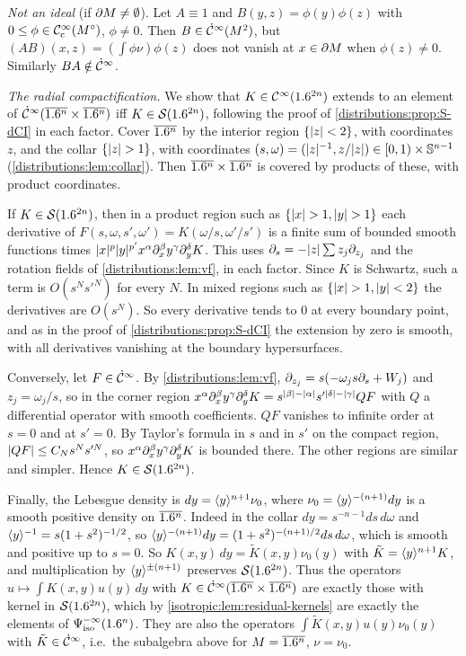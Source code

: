 \emph{Not an ideal} (if $\partial M\ne\emptyset$). Let $A\equiv1$ and $B(y,z)=\phi(y)\phi(z)$ with
$0\le\phi\in\mathcal{C}^\infty_{\mathrm{c}}(M^\circ)$, $\phi\ne0$. Then $B\in\dot{\mathcal{C}}^\infty(M^2)$, but $(AB)(x,z)=(\int\phi\nu)\phi(z)$ does not
vanish at $x\in\partial M$ when $\phi(z)\ne0$. Similarly $BA\notin\dot{\mathcal{C}}^\infty$.

\emph{The radial compactification.} We show that $K\in\mathcal{C}^\infty(1.6^{2n})$ extends to an element of
$\dot{\mathcal{C}}^\infty(\overline{1.6^n}\times\overline{1.6^n})$ iff $K\in\mathcal{S}(1.6^{2n})$, following the proof of
\cref{distributions:prop:S-dCI} in each factor. Cover $\overline{1.6^n}$ by the interior region
$\{\lvert z\rvert<2\}$, with coordinates $z$, and the collar $\{\lvert z\rvert>1\}$, with coordinates
$(s,\omega)=(\lvert z\rvert^{-1},z/\lvert z\rvert)\in[0,1)\times\mathbb{S}^{n-1}$ (\cref{distributions:lem:collar}). Then
$\overline{1.6^n}\times\overline{1.6^n}$ is covered by products of these, with product coordinates.

If $K\in\mathcal{S}(1.6^{2n})$, then in a product region such as $\{\lvert x\rvert>1,\lvert y\rvert>1\}$ each derivative of
$F(s,\omega,s',\omega')=K(\omega/s,\omega'/s')$ is a finite sum of bounded smooth functions times
$\lvert x\rvert^p\lvert y\rvert^{p'}x^\alpha\partial^\beta_xy^\gamma\partial^\delta_yK$. This uses $\partial_s=-\lvert z\rvert\sum z_j\partial_{z_j}$ and the
rotation fields of \cref{distributions:lem:vf}, in each factor. Since $K$ is Schwartz, such a
term is $O(s^Ns'^N)$ for every $N$. In mixed regions such as $\{\lvert x\rvert>1,\lvert y\rvert<2\}$ the derivatives
are $O(s^N)$. So every derivative tends to $0$ at every boundary point, and as in the proof
of \cref{distributions:prop:S-dCI} the extension by zero is smooth, with all derivatives
vanishing at the boundary hypersurfaces.

Conversely, let $F\in\dot{\mathcal{C}}^\infty$. By \cref{distributions:lem:vf},
$\partial_{z_j}=s(-\omega_js\partial_s+W_j)$ and $z_j=\omega_j/s$, so in the corner region
$x^\alpha\partial^\beta_xy^\gamma\partial^\delta_yK=s^{\lvert \beta\rvert-\lvert \alpha\rvert}s'^{\lvert \delta\rvert-\lvert \gamma\rvert}QF$ with $Q$ a differential
operator with smooth coefficients. $QF$ vanishes to infinite order at $s=0$ and at
$s'=0$. By Taylor's formula in $s$ and in $s'$ on the compact region, $\lvert QF\rvert\le C_Ns^Ns'^N$,
so $x^\alpha\partial^\beta_xy^\gamma\partial^\delta_yK$ is bounded there. The other regions are similar and
simpler. Hence $K\in\mathcal{S}(1.6^{2n})$.

Finally, the Lebesgue density is $dy=\langle y\rangle^{n+1}\nu_0$, where $\nu_0=\langle y\rangle^{-(n+1)}dy$ is a
smooth positive density on $\overline{1.6^n}$. Indeed in the collar $dy=s^{-n-1}ds\,d\omega$ and
$\langle y\rangle^{-1}=s(1+s^2)^{-1/2}$, so $\langle y\rangle^{-(n+1)}dy=(1+s^2)^{-(n+1)/2}ds\,d\omega$, which is smooth and
positive up to $s=0$. So
$K(x,y)\,dy=\tilde K(x,y)\nu_0(y)$ with $\tilde K=\langle y\rangle^{n+1}K$, and multiplication by $\langle y\rangle^{\pm(n+1)}$
preserves $\mathcal{S}(1.6^{2n})$. Thus the operators $u\mapsto\int K(x,y)u(y)\,dy$ with
$K\in\dot{\mathcal{C}}^\infty(\overline{1.6^n}\times\overline{1.6^n})$ are exactly those with kernel in $\mathcal{S}(1.6^{2n})$, which by
\cref{isotropic:lem:residual-kernels} are exactly the elements of $\Psi^{-\infty}_{\mathrm{iso}}(1.6^n)$. They are
also the operators $\int\tilde K(x,y)u(y)\nu_0(y)$ with $\tilde K\in\dot{\mathcal{C}}^\infty$, i.e.\ the subalgebra above
for $M=\overline{1.6^n}$, $\nu=\nu_0$.

